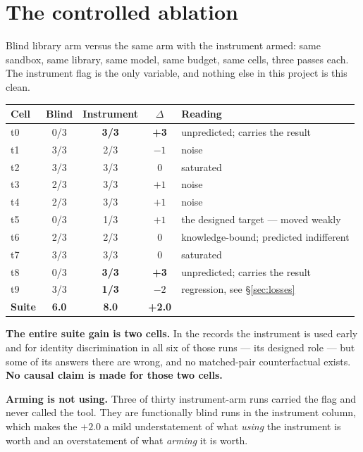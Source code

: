 \documentclass[11pt,a4paper]{report}
\newcommand{\keyrule}[1]{\textbf{\textcolor{acc}{#1}}}
\begin{document}
\section{The controlled ablation}

Blind library arm versus the same arm with the instrument armed: same sandbox,
same library, same model, same budget, same cells, three passes each. The
instrument flag is the only variable, and nothing else in this project is this
clean.

\begin{table}[htbp]
\centering\small
\begin{tabular}{@{}l c c c l@{}}
\toprule
\textbf{Cell} & \textbf{Blind} & \textbf{Instrument} & \textbf{$\Delta$} & \textbf{Reading} \\
\midrule
t0 & 0/3 & \textbf{3/3} & \textbf{+3} & unpredicted; carries the result \\
t1 & 3/3 & 2/3 & $-1$ & noise \\
t2 & 3/3 & 3/3 & 0 & saturated \\
t3 & 2/3 & 3/3 & $+1$ & noise \\
t4 & 2/3 & 3/3 & $+1$ & noise \\
t5 & 0/3 & 1/3 & $+1$ & the designed target --- moved weakly \\
t6 & 2/3 & 2/3 & 0 & knowledge-bound; predicted indifferent \\
t7 & 3/3 & 3/3 & 0 & saturated \\
t8 & 0/3 & \textbf{3/3} & \textbf{+3} & unpredicted; carries the result \\
t9 & 3/3 & \textbf{1/3} & \textbf{$-2$} & regression, see §\ref{sec:losses} \\
\midrule
\textbf{Suite} & \textbf{6.0} & \textbf{8.0} & \textbf{+2.0} & \\
\bottomrule
\end{tabular}
\end{table}

\noindent
\textbf{The entire suite gain is two cells.} In the records the instrument is
used early and for identity discrimination in all six of those runs --- its
designed role --- but some of its answers there are wrong, and no matched-pair
counterfactual exists. \textbf{No causal claim is made for those two cells.}

\keyrule{Arming is not using.} Three of thirty instrument-arm runs carried the flag
and never called the tool. They are functionally blind runs in the instrument
column, which makes the $+2.0$ a mild understatement of what \emph{using} the
instrument is worth and an overstatement of what \emph{arming} it is worth.
\end{document}
